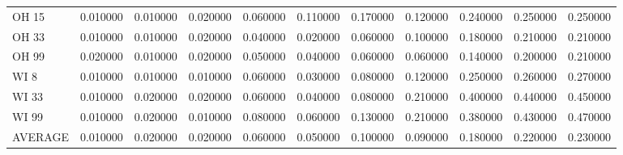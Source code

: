 \begin{tabular}{lrrrrrrrrrr}
OH 15 & 0.010000 & 0.010000 & 0.020000 & 0.060000 & 0.110000 & 0.170000 & 0.120000 & 0.240000 & 0.250000 & 0.250000 \\
OH 33 & 0.010000 & 0.010000 & 0.020000 & 0.040000 & 0.020000 & 0.060000 & 0.100000 & 0.180000 & 0.210000 & 0.210000 \\
OH 99 & 0.020000 & 0.010000 & 0.020000 & 0.050000 & 0.040000 & 0.060000 & 0.060000 & 0.140000 & 0.200000 & 0.210000 \\
WI 8 & 0.010000 & 0.010000 & 0.010000 & 0.060000 & 0.030000 & 0.080000 & 0.120000 & 0.250000 & 0.260000 & 0.270000 \\
WI 33 & 0.010000 & 0.020000 & 0.020000 & 0.060000 & 0.040000 & 0.080000 & 0.210000 & 0.400000 & 0.440000 & 0.450000 \\
WI 99 & 0.010000 & 0.020000 & 0.010000 & 0.080000 & 0.060000 & 0.130000 & 0.210000 & 0.380000 & 0.430000 & 0.470000 \\
AVERAGE & 0.010000 & 0.020000 & 0.020000 & 0.060000 & 0.050000 & 0.100000 & 0.090000 & 0.180000 & 0.220000 & 0.230000 \\
\bottomrule
\end{tabular}
